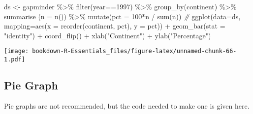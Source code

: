 \documentclass[
]{book}
\newenvironment{Shaded}{\begin{snugshade}}{\end{snugshade}}
\newcommand{\AttributeTok}[1]{\textcolor[rgb]{0.77,0.63,0.00}{#1}}
\newcommand{\CommentTok}[1]{\textcolor[rgb]{0.56,0.35,0.01}{\textit{#1}}}
\newcommand{\DecValTok}[1]{\textcolor[rgb]{0.00,0.00,0.81}{#1}}
\newcommand{\FunctionTok}[1]{\textcolor[rgb]{0.00,0.00,0.00}{#1}}
\newcommand{\NormalTok}[1]{#1}
\newcommand{\OtherTok}[1]{\textcolor[rgb]{0.56,0.35,0.01}{#1}}
\newcommand{\SpecialCharTok}[1]{\textcolor[rgb]{0.00,0.00,0.00}{#1}}
\newcommand{\StringTok}[1]{\textcolor[rgb]{0.31,0.60,0.02}{#1}}
\begin{document}
\begin{Shaded}
\begin{Highlighting}[]
\NormalTok{ds }\OtherTok{\textless{}{-}}\NormalTok{ gapminder }\SpecialCharTok{\%\textgreater{}\%} 
  \FunctionTok{filter}\NormalTok{(year}\SpecialCharTok{==}\DecValTok{1997}\NormalTok{) }\SpecialCharTok{\%\textgreater{}\%} 
  \FunctionTok{group\_by}\NormalTok{(continent)  }\SpecialCharTok{\%\textgreater{}\%}
  \FunctionTok{summarise}\NormalTok{ (}\AttributeTok{n =} \FunctionTok{n}\NormalTok{()) }\SpecialCharTok{\%\textgreater{}\%}
  \FunctionTok{mutate}\NormalTok{(}\AttributeTok{pct =} \DecValTok{100}\SpecialCharTok{*}\NormalTok{n }\SpecialCharTok{/} \FunctionTok{sum}\NormalTok{(n)) }
\CommentTok{\#}
\FunctionTok{ggplot}\NormalTok{(}\AttributeTok{data=}\NormalTok{ds, }\AttributeTok{mapping=}\FunctionTok{aes}\NormalTok{(}\AttributeTok{x =} \FunctionTok{reorder}\NormalTok{(continent, pct), }\AttributeTok{y =}\NormalTok{ pct)) }\SpecialCharTok{+} 
  \FunctionTok{geom\_bar}\NormalTok{(}\AttributeTok{stat =} \StringTok{"identity"}\NormalTok{) }\SpecialCharTok{+}
  \FunctionTok{coord\_flip}\NormalTok{() }\SpecialCharTok{+}
  \FunctionTok{xlab}\NormalTok{(}\StringTok{"Continent"}\NormalTok{) }\SpecialCharTok{+} \FunctionTok{ylab}\NormalTok{(}\StringTok{"Percentage"}\NormalTok{)}
\end{Highlighting}
\end{Shaded}

\texttt{[image: bookdown-R-Essentials\_files/figure-latex/unnamed-chunk-66-1.pdf]}

\hypertarget{pie-graph}{%
\subsection{Pie Graph}\label{pie-graph}}

Pie graphs are not recommended, but the code needed to make one is given here.
\end{document}

